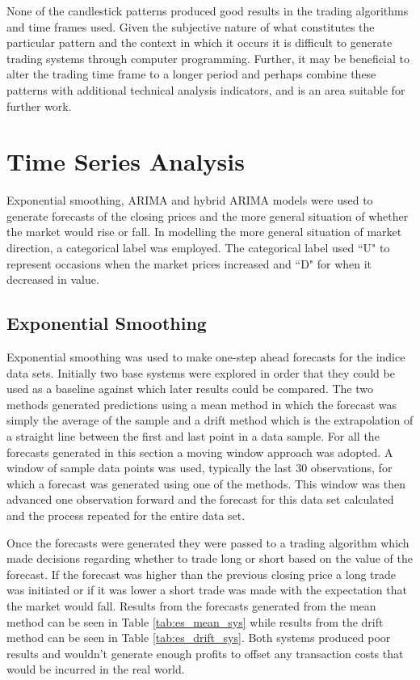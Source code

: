 None of the candlestick patterns produced good results in the trading algorithms and time frames used. Given the subjective nature of what constitutes the particular pattern and the context in which it occurs it is difficult to generate trading systems through computer programming. Further, it may be beneficial to alter the trading time frame to a longer period and perhaps combine these patterns with additional technical analysis indicators, and is an area suitable for further work. 

\section{Time Series Analysis}
Exponential smoothing, ARIMA and hybrid ARIMA models were used to generate forecasts of the closing prices and the more general situation of whether the market would rise or fall. In modelling the more general situation of market direction, a categorical label was employed. The categorical label used \textquotedblleft U" to represent occasions when the market prices increased and \textquotedblleft D" for when it decreased in value. 

\subsection{Exponential Smoothing}
Exponential smoothing was used to make one-step ahead forecasts for the indice data sets. Initially two base systems were explored in order that they could be used as a baseline against which later results could be compared. The two methods generated predictions using a mean method in which the forecast was simply the average of the sample and a drift method which is the extrapolation of a straight line between the first and last point in a data sample. For all the forecasts generated in this section a moving window approach was adopted. A window of sample data points was used, typically the last 30 observations, for which a forecast was generated using one of the methods. This window was then advanced one observation forward and the forecast for this data set calculated and the process repeated for the entire data set.

Once the forecasts were generated they were passed to a trading algorithm which made decisions regarding whether to trade long or short based on the value of the forecast. If the forecast was higher than the previous closing price a long trade was initiated or if it was lower a short trade was made with the expectation that the market would fall. Results from the forecasts generated from the mean method can be seen in Table \ref{tab:es_mean_sys} while results from the drift method can be seen in Table \ref{tab:es_drift_sys}. Both systems produced poor results and wouldn't generate enough profits to offset any transaction costs that would be incurred in the real world.

